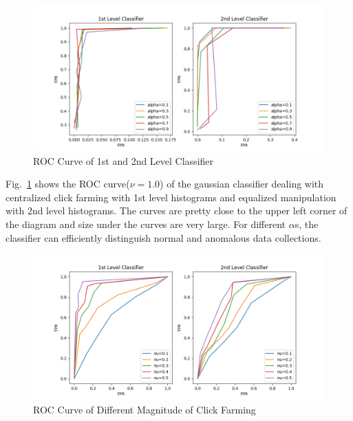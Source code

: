 \documentclass[a4paper]{IEEEtran}
\begin{document}
			\begin{figure}[!ht]
				\centering
				\includegraphics[width=\linewidth]{fig/ROC-Alpha.png}
				\caption{ROC Curve of 1st and 2nd Level Classifier}
				\label{fig:roc-alpha}
			\end{figure}
			
			Fig.~\ref{fig:roc-alpha} shows the ROC curve($\nu=1.0$) of the gaussian classifier dealing with centralized click farming with 1st level histograms and equalized manipulation with 2nd level histograms. The curves are pretty close to the upper left corner of the diagram and size under the curves are very large. For different $\alpha$s, the classifier can efficiently distinguish normal and anomalous data collections.
			
			\begin{figure}[!ht]
				\centering
				\includegraphics[width=\linewidth]{fig/ROC-Nu.png}
				\caption{ROC Curve of Different Magnitude of Click Farming}
				\label{fig:roc-magnitude}
			\end{figure}
			
\end{document}
